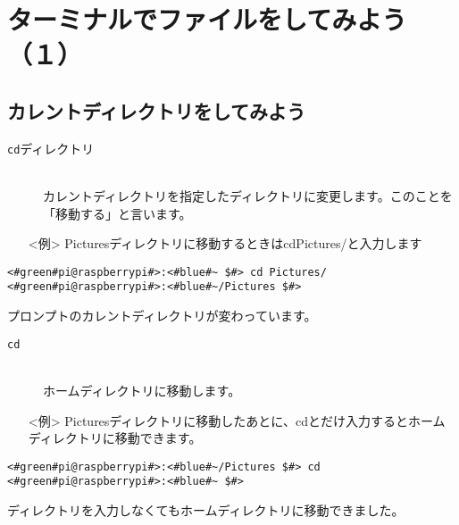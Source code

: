 \newpage
\section{ターミナルでファイルをしてみよう（１）}

\subsection{カレントディレクトリをしてみよう}
\begin{description}
\item[\texttt{cd}\textvisiblespace ディレクトリ]\mbox{}\\
カレントディレクトリを指定したディレクトリに変更します。このことを「移動する」と言います。
\end{description}
\begin{itemize}
\item[<例>] Picturesディレクトリに移動するときはcd\textvisiblespace Pictures/と入力します
\end{itemize}

\begin{lstlisting}[caption=cd directoryの例, label=cdDir]
<#green#pi@raspberrypi#>:<#blue#~ $#> cd Pictures/
<#green#pi@raspberrypi#>:<#blue#~/Pictures $#>
\end{lstlisting}
プロンプトのカレントディレクトリが変わっています。

\begin{description}
\item[\texttt{cd}]\mbox{}\\
ホームディレクトリに移動します。
\end{description}
\begin{itemize}
\item[<例>] Picturesディレクトリに移動したあとに、cdとだけ入力するとホームディレクトリに移動できます。
\end{itemize}
\begin{lstlisting}[caption=cdの例, label=cd]
<#green#pi@raspberrypi#>:<#blue#~/Pictures $#> cd
<#green#pi@raspberrypi#>:<#blue#~ $#> 
\end{lstlisting}
ディレクトリを入力しなくてもホームディレクトリに移動できました。\\


